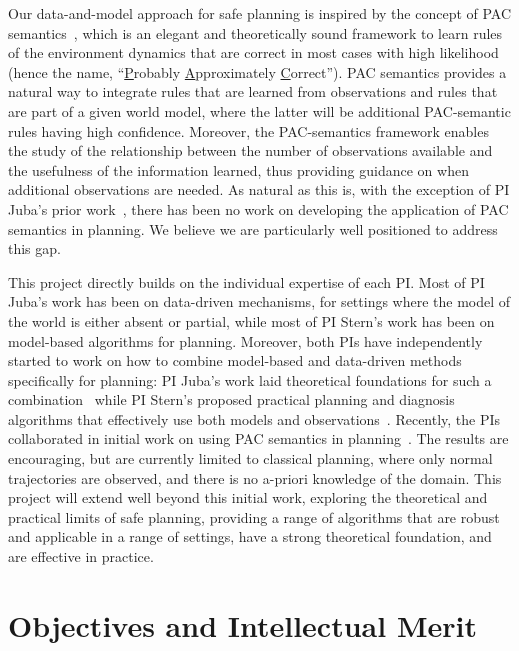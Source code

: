 \documentclass[12pt]{article}
\begin{document}
Our data-and-model approach for safe planning is inspired by the concept of PAC semantics~\cite{valiant2000robustLogics}, 
which is an elegant and theoretically sound framework to learn rules of the environment dynamics that are correct in most cases with high likelihood (hence the name, ``{\underline P}robably {\underline A}pproximately {\underline C}orrect''). PAC semantics provides a natural way to integrate rules that are learned from observations and rules that are part of a given world model, where the latter will be additional PAC-semantic rules having high confidence. Moreover, the PAC-semantics framework enables the study of the relationship between the number of observations available and the usefulness of the information learned, thus providing guidance on when additional observations are needed. 
As natural as this is, with the exception of PI Juba's prior work~\cite{juba2016jmlr,juba2016aaai,zhang2017aaai}, there has been no work on developing the application of PAC semantics in planning.  
We believe we are particularly well positioned to address this gap.


This project directly builds on the individual expertise of each PI. Most of PI Juba's work has been on data-driven mechanisms, for settings where the model of the world is either absent or partial, while most of PI Stern's work has been on model-based algorithms for planning. Moreover, both PIs have independently started to work on how to combine model-based and data-driven methods specifically for planning: PI Juba's work laid theoretical foundations for such a combination~\cite{juba2016aaai,juba2016jmlr} while PI Stern's proposed practical planning and diagnosis algorithms that effectively use both models and observations~\cite{elmishali2016dataAugmented,stern2011probably,stern2012search}. 
Recently, the PIs collaborated in initial work on using PAC semantics in planning~\cite{stern2017efficientAndSafe}. 
The results are encouraging, but are currently limited to classical planning, where only normal trajectories are observed, 
and there is no a-priori knowledge of the domain. 
This project will extend well beyond this initial work, exploring the theoretical and practical limits of safe planning, providing a range of algorithms that are robust and applicable in a range of settings, have a strong theoretical foundation, and are effective in practice. 


\section{Objectives and Intellectual Merit}
\end{document}
